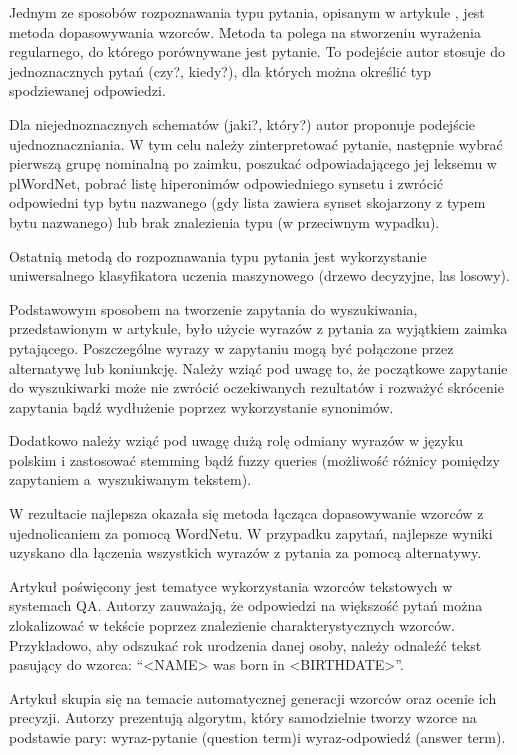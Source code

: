 Jednym ze sposobów rozpoznawania typu pytania, opisanym w artykule \cite{przybyla-2013-question}, jest metoda dopasowywania wzorców. Metoda ta polega na stworzeniu wyrażenia regularnego, do którego porównywane jest pytanie. To podejście autor stosuje do jednoznacznych pytań (czy?, kiedy?), dla których można określić typ spodziewanej odpowiedzi. 

Dla niejednoznacznych schematów (jaki?, który?) autor proponuje podejście ujednoznaczniania. W tym celu należy zinterpretować pytanie, następnie wybrać pierwszą grupę nominalną po zaimku, poszukać odpowiadającego jej leksemu w plWordNet, pobrać listę hiperonimów odpowiedniego synsetu i zwrócić odpowiedni typ bytu nazwanego (gdy lista zawiera synset skojarzony z typem bytu nazwanego) lub brak znalezienia typu (w przeciwnym wypadku).

Ostatnią metodą do rozpoznawania typu pytania jest wykorzystanie uniwersalnego klasyfikatora uczenia maszynowego (drzewo decyzyjne, las losowy).

Podstawowym sposobem na tworzenie zapytania do wyszukiwania, przedstawionym w artykule, było użycie wyrazów z pytania za wyjątkiem zaimka pytającego. Poszczególne wyrazy w zapytaniu mogą być połączone przez alternatywę lub koniunkcję. Należy wziąć pod uwagę to, że początkowe zapytanie do wyszukiwarki może nie zwrócić oczekiwanych rezultatów i rozważyć skrócenie zapytania bądź wydłużenie poprzez wykorzystanie synonimów. 

Dodatkowo należy wziąć pod uwagę dużą rolę odmiany wyrazów w języku polskim i zastosować stemming bądź fuzzy queries (możliwość różnicy pomiędzy zapytaniem a~wyszukiwanym tekstem).

W rezultacie najlepsza okazała się metoda łącząca dopasowywanie wzorców z ujednolicaniem za pomocą WordNetu. W przypadku zapytań, najlepsze wyniki uzyskano dla łączenia wszystkich wyrazów z pytania za pomocą alternatywy. 

Artykuł \cite{ravichandran-hovy-2002-learning} poświęcony jest tematyce wykorzystania wzorców tekstowych w systemach QA. Autorzy zauważają, że odpowiedzi na większość pytań można zlokalizować w tekście poprzez znalezienie charakterystycznych wzorców. Przykładowo, aby odszukać rok urodzenia danej osoby, należy odnaleźć tekst pasujący do wzorca: “<NAME> was born in <BIRTHDATE>”.

Artykuł skupia się na temacie automatycznej generacji wzorców oraz ocenie ich precyzji. Autorzy prezentują algorytm, który samodzielnie tworzy wzorce na podstawie pary: wyraz-pytanie (question term)i wyraz-odpowiedź (answer term). 

